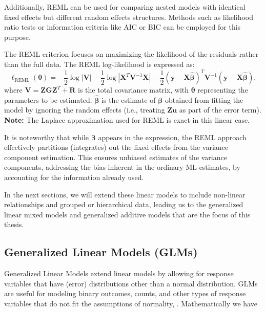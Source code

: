 \documentclass[12pt, twoside,hidelinks]{article}
\theoremstyle{definition}
\numberwithin{equation}{section}
\begin{document}
Additionally, REML can be used for comparing nested models with identical fixed effects but different random effects structures. Methods such as likelihood ratio tests or information criteria like AIC or BIC can be employed for this purpose.
\newline

The REML criterion focuses on maximizing the likelihood of the residuals rather than the full data. The REML log-likelihood is expressed as:
\begin{equation}
\ell_{\text{REML}}(\boldsymbol{\theta}) = -\frac{1}{2} \log |\mathbf{V}| -\frac{1}{2} \log |\mathbf{X}^T \mathbf{V}^{-1} \mathbf{X}| -\frac{1}{2} (\mathbf{y} - \mathbf{X}\boldsymbol{\hat{\beta}})^T \mathbf{V}^{-1} (\mathbf{y} - \mathbf{X}\boldsymbol{\hat{\beta}}),
\label{eq:reml_log_likelihood}
\end{equation}
where \(\mathbf{V} = \mathbf{Z}\mathbf{G}\mathbf{Z}^T + \mathbf{R}\) is the total covariance matrix, with \(\boldsymbol{\theta}\) representing the parameters to be estimated. $\boldsymbol{\hat{\beta}}$
is the estimate of $\boldsymbol{\beta}$ obtained from fitting the model by ignoring the random effects (i.e., treating $\boldsymbol{Zu}$ as part of the error term). 
\textbf{Note:} The Laplace approximation used for REML is exact in this linear case. 
\newline

It is noteworthy that while \(\boldsymbol{\beta}\) appears in the expression, the REML approach effectively partitions (integrates) out the fixed effects from the variance component estimation. This ensures unbiased estimates of the variance components, addressing the bias inherent in the ordinary ML estimates, by accounting for the information already used.
\newline

In the next sections, we will extend these linear models to include non-linear relationships and grouped or hierarchical data, leading us to the generalized linear mixed models and generalized additive models that are the focus of this thesis.

\subsection{Generalized Linear Models (GLMs)}\label{sec:regmod:glm}

Generalized Linear Models extend linear models by allowing for response variables that have (error) distributions other than a normal distribution. GLMs are useful for modeling binary outcomes, counts, and other types of response variables that do not fit the assumptions of normality, \citep{dobson}. Mathematically we have
\end{document}

